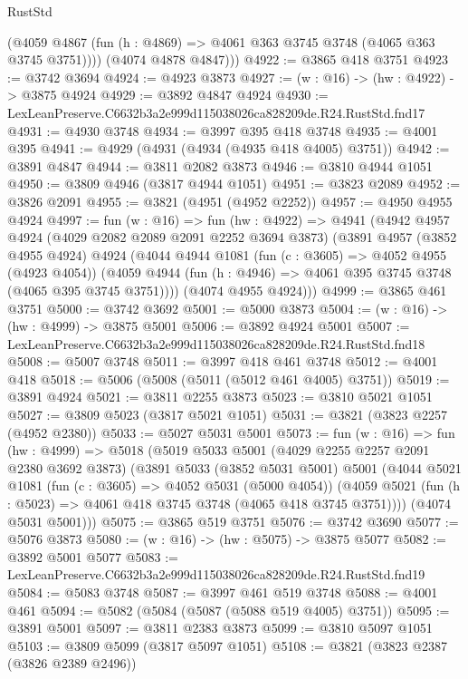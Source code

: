 \begin{lexlean}{RustStd}
\begin{coremodule}
          (@4059 @4867 (fun (h : @4869) => @4061 @363 @3745 @3748 (@4065 @363 @3745 @3751))))
        (@4074 @4878 @4847)))
@4922 := @3865 @418 @3751
@4923 := @3742 @3694
@4924 := @4923 @3873
@4927 := (w : @16) -> (hw : @4922) -> @3875 @4924
@4929 := @3892 @4847 @4924
@4930 := LexLeanPreserve.C6632b3a2e999d115038026ca828209de.R24.RustStd.fnd17
@4931 := @4930 @3748
@4934 := @3997 @395 @418 @3748
@4935 := @4001 @395
@4941 := @4929 (@4931 (@4934 (@4935 @418 @4005) @3751))
@4942 := @3891 @4847
@4944 := @3811 @2082 @3873
@4946 := @3810 @4944 @1051
@4950 := @3809 @4946 (@3817 @4944 @1051)
@4951 := @3823 @2089
@4952 := @3826 @2091
@4955 := @3821 (@4951 (@4952 @2252))
@4957 := @4950 @4955 @4924
@4997 := fun (w : @16) =>
  fun (hw : @4922) =>
  @4941
    (@4942
      @4957
      @4924
      (@4029 @2082 @2089 @2091 @2252 @3694 @3873)
      (@3891
        @4957
        (@3852 @4955 @4924)
        @4924
        (@4044
          @4944
          @1081
          (fun (c : @3605) => @4052 @4955 (@4923 @4054))
          (@4059 @4944 (fun (h : @4946) => @4061 @395 @3745 @3748 (@4065 @395 @3745 @3751))))
        (@4074 @4955 @4924)))
@4999 := @3865 @461 @3751
@5000 := @3742 @3692
@5001 := @5000 @3873
@5004 := (w : @16) -> (hw : @4999) -> @3875 @5001
@5006 := @3892 @4924 @5001
@5007 := LexLeanPreserve.C6632b3a2e999d115038026ca828209de.R24.RustStd.fnd18
@5008 := @5007 @3748
@5011 := @3997 @418 @461 @3748
@5012 := @4001 @418
@5018 := @5006 (@5008 (@5011 (@5012 @461 @4005) @3751))
@5019 := @3891 @4924
@5021 := @3811 @2255 @3873
@5023 := @3810 @5021 @1051
@5027 := @3809 @5023 (@3817 @5021 @1051)
@5031 := @3821 (@3823 @2257 (@4952 @2380))
@5033 := @5027 @5031 @5001
@5073 := fun (w : @16) =>
  fun (hw : @4999) =>
  @5018
    (@5019
      @5033
      @5001
      (@4029 @2255 @2257 @2091 @2380 @3692 @3873)
      (@3891
        @5033
        (@3852 @5031 @5001)
        @5001
        (@4044
          @5021
          @1081
          (fun (c : @3605) => @4052 @5031 (@5000 @4054))
          (@4059 @5021 (fun (h : @5023) => @4061 @418 @3745 @3748 (@4065 @418 @3745 @3751))))
        (@4074 @5031 @5001)))
@5075 := @3865 @519 @3751
@5076 := @3742 @3690
@5077 := @5076 @3873
@5080 := (w : @16) -> (hw : @5075) -> @3875 @5077
@5082 := @3892 @5001 @5077
@5083 := LexLeanPreserve.C6632b3a2e999d115038026ca828209de.R24.RustStd.fnd19
@5084 := @5083 @3748
@5087 := @3997 @461 @519 @3748
@5088 := @4001 @461
@5094 := @5082 (@5084 (@5087 (@5088 @519 @4005) @3751))
@5095 := @3891 @5001
@5097 := @3811 @2383 @3873
@5099 := @3810 @5097 @1051
@5103 := @3809 @5099 (@3817 @5097 @1051)
@5108 := @3821 (@3823 @2387 (@3826 @2389 @2496))

\end{coremodule}
\end{lexlean}
